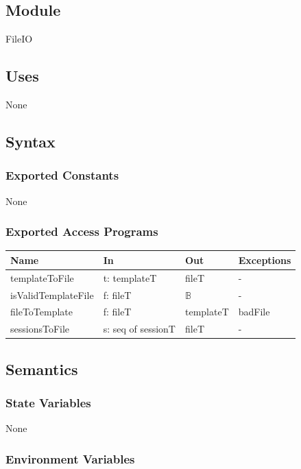 \documentclass[12pt, titlepage]{article}
\begin{document}
\subsection{Module}

FileIO

\subsection{Uses}

None

\subsection{Syntax}

\subsubsection{Exported Constants}

None

\subsubsection{Exported Access Programs}

\begin{center}
\small
\begin{tabular}{p{3.3cm} p{4.7cm} p{2.6cm} p{2.8cm}}
\hline
\textbf{Name} & \textbf{In} & \textbf{Out} & \textbf{Exceptions} \\
\hline
templateToFile & t: templateT & fileT & - \\
isValidTemplateFile & f: fileT & $\mathbb{B}$ & - \\
fileToTemplate & f: fileT & templateT & badFile \\
sessionsToFile & s: seq of sessionT & fileT & - \\
\hline
\end{tabular}
\end{center}

\subsection{Semantics}

\subsubsection{State Variables}

None

\subsubsection{Environment Variables}
\end{document}
